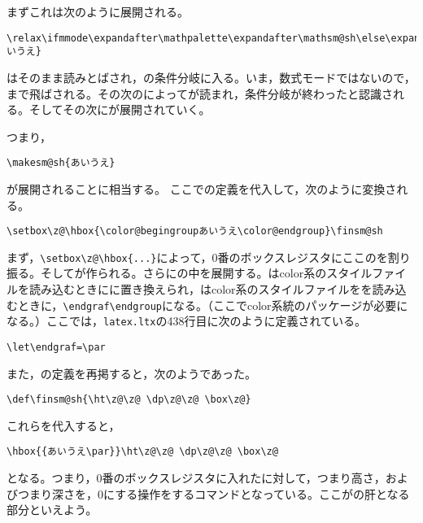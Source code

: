 \documentclass[autodetect-engine,dvipdfmx]{jsarticle}
\begin{document}
まずこれは次のように展開される。

\texsource
\begin{lstlisting}
\relax\ifmmode\expandafter\mathpalette\expandafter\mathsm@sh\else\expandafter\makesm@sh\fi{あいうえ}
\end{lstlisting}

はそのまま読みとばされ，の条件分岐に入る。いま，数式モードではないので，まで飛ばされる。その次のによってが読まれ，条件分岐が終わったと認識される。そしてその次にが展開されていく。

つまり，

\texsource
\begin{lstlisting}
\makesm@sh{あいうえ}
\end{lstlisting}
が展開されることに相当する。
ここでの定義を代入して，次のように変換される。

\texsource
\begin{lstlisting}
\setbox\z@\hbox{\color@begingroupあいうえ\color@endgroup}\finsm@sh\end{lstlisting}

まず，\preSub\verb|\setbox\z@\hbox{...}|\preSub によって，0番のボックスレジスタにここのを割り振る。そしてが作られる。さらにの中を展開する。はcolor系のスタイルファイルを読み込むときにに置き換えられ，はcolor系のスタイルファイルをを読み込むときに，\preSub\verb|\endgraf\endgroup|\preSub になる。（ここでcolor系統のパッケージが必要になる。）ここでは，\texttt{latex.ltx}の438行目に次のように定義されている。

\latexltx
\begin{lstlisting}[firstnumber=438]
\let\endgraf=\par
\end{lstlisting}

また，の定義を再掲すると，次のようであった。

\latexltx
\begin{lstlisting}[firstnumber=4147]
\def\finsm@sh{\ht\z@\z@ \dp\z@\z@ \box\z@}
\end{lstlisting}

これらを代入すると，

\texsource
\begin{lstlisting}
\hbox{{あいうえ\par}}\ht\z@\z@ \dp\z@\z@ \box\z@
\end{lstlisting}
となる。つまり，0番のボックスレジスタに入れたに対して，つまり高さ，およびつまり深さを，0にする操作をするコマンドとなっている。ここがの肝となる部分といえよう。
\end{document}
